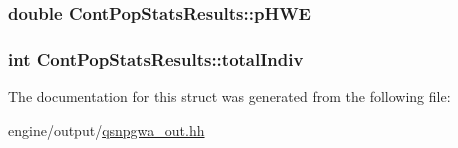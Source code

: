 \label{structContPopStatsResults_a2f6fdbe9de430b4860ab85784061433b}
\hypertarget{structContPopStatsResults_af9e5a8c489fe6382b04b9164087ca2fc}{
\subsubsection[{pHWE}]{\setlength{\rightskip}{0pt plus 5cm}double {\bf ContPopStatsResults::pHWE}}}
\label{structContPopStatsResults_af9e5a8c489fe6382b04b9164087ca2fc}
\hypertarget{structContPopStatsResults_a04ef963080d03327b6e6d1eebe843106}{
\subsubsection[{totalIndiv}]{\setlength{\rightskip}{0pt plus 5cm}int {\bf ContPopStatsResults::totalIndiv}}}
\label{structContPopStatsResults_a04ef963080d03327b6e6d1eebe843106}


The documentation for this struct was generated from the following file:\begin{DoxyCompactItemize}
\item 
engine/output/\hyperlink{qsnpgwa__out_8hh}{qsnpgwa\_\-out.hh}\end{DoxyCompactItemize}
